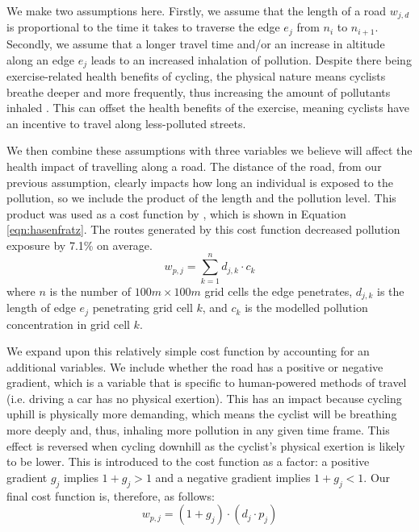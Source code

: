 \documentclass[11pt,twosided,a4paper]{report}
\begin{document}
We make two assumptions here. Firstly, we assume that the length of a road $w_{j, d}$ is proportional to the time it takes to traverse the edge $e_j$ from $n_i$ to $n_{i+1}$. Secondly, we assume that a longer travel time and/or an increase in altitude along an edge $e_j$ leads to an increased inhalation of pollution. Despite there being exercise-related health benefits of cycling, the physical nature means cyclists breathe deeper and more frequently, thus increasing the amount of pollutants inhaled \citep{bigazzi2014reviewintake, Ramos2016inhaleddose}. This can offset the health benefits of the exercise, meaning cyclists have an incentive to travel along less-polluted streets.

We then combine these assumptions with three variables we believe will affect the health impact of travelling along a road. The distance of the road, from our previous assumption, clearly impacts how long an individual is exposed to the pollution, so we include the product of the length and the pollution level. This product was used as a cost function by \cite{Hasenfratz2015highresmapsTram}, which is shown in Equation \ref{eqn:hasenfratz}. The routes generated by this cost function decreased pollution exposure by 7.1\% on average.
\begin{equation} \label{eqn:hasenfratz}
w_{p, j} = \sum_{k=1}^{n} d_{j, k} \cdot c_k
\end{equation}
where $n$ is the number of $100m \times 100m$ grid cells the edge penetrates, $d_{j, k}$ is the length of edge $e_j$ penetrating grid cell $k$, and $c_k$ is the modelled pollution concentration in grid cell $k$.

We expand upon this relatively simple cost function by accounting for an additional variables. We include whether the road has a positive or negative gradient, which is a variable that is specific to human-powered methods of travel (i.e. driving a car has no physical exertion). This has an impact because cycling uphill is physically more demanding, which means the cyclist will be breathing more deeply and, thus, inhaling more pollution in any given time frame. This effect is reversed when cycling downhill as the cyclist's physical exertion is likely to be lower. This is introduced to the cost function as a factor: a positive gradient $g_j$ implies $1 + g_j > 1$ and a negative gradient implies $1 + g_j < 1$. Our final cost function is, therefore, as follows:%
\begin{equation}
w_{p, j} = (1 + g_j) \cdot (d_j \cdot p_j)
\end{equation}
\end{document}
